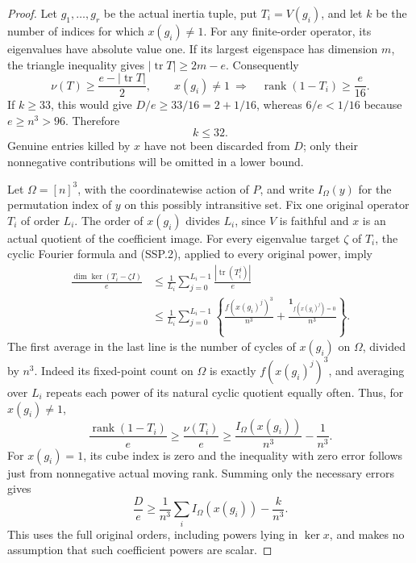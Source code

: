 \begin{proof}
Let $g_1,\ldots,g_r$ be the actual inertia tuple, put $T_i=V(g_i)$,
and let $k$ be the number of indices for which $x(g_i)\ne1$.
For any finite-order operator, its eigenvalues have absolute value
one.  If its largest eigenspace has dimension $m$, the triangle
inequality gives $|\operatorname{tr}T|\ge2m-e$.  Consequently
\[
 \nu(T)\ge\frac{e-|\operatorname{tr}T|}{2},\qquad
 x(g_i)\ne1\ \Longrightarrow\quad
 \operatorname{rank}(1-T_i)\ge\frac e{16}.
 \tag{SSP.3}
\]
If $k\ge33$, this would give
$D/e\ge33/16=2+1/16$, whereas $6/e<1/16$ because
$e\ge n^3>96$.  Therefore
\[
                              k\le32.
 \tag{SSP.4}
\]
Genuine entries killed by $x$ have not been discarded from $D$;
only their nonnegative contributions will be omitted in a lower
bound.

Let $\Omega=[n]^3$, with the coordinatewise action of $P$, and
write $I_\Omega(y)$ for the permutation index of $y$ on this
possibly intransitive set.  Fix one original operator $T_i$ of
order $L_i$.  The order of $x(g_i)$ divides $L_i$, since $V$ is
faithful and $x$ is an actual quotient of the coefficient image.
For every eigenvalue target $\zeta$ of $T_i$, the cyclic Fourier
formula and (SSP.2), applied to every original power, imply
\[
 \begin{split}
 \frac{\dim\ker(T_i-\zeta I)}e
 &\le\frac1{L_i}\sum_{j=0}^{L_i-1}
                \frac{|\operatorname{tr}(T_i^j)|}{e}\\
 &\le\frac1{L_i}\sum_{j=0}^{L_i-1}
       \left\{\frac{f(x(g_i)^j)^3}{n^3}
                    +\frac{\mathbf1_{f(x(g_i)^j)=0}}{n^3}\right\}.
 \end{split}
 \tag{SSP.5}
\]
The first average in the last line is the number of cycles of
$x(g_i)$ on $\Omega$, divided by $n^3$.  Indeed its fixed-point
count on $\Omega$ is exactly $f(x(g_i)^j)^3$, and averaging over
$L_i$ repeats each power of its natural cyclic quotient equally
often.  Thus, for $x(g_i)\ne1$,
\[
 \frac{\operatorname{rank}(1-T_i)}e
 \ge\frac{\nu(T_i)}e
 \ge\frac{I_\Omega(x(g_i))}{n^3}-\frac1{n^3}.
 \tag{SSP.6}
\]
For $x(g_i)=1$, its cube index is zero and the inequality with
zero error follows just from nonnegative actual moving rank.
Summing only the necessary errors gives
\[
 \frac De\ge\frac1{n^3}\sum_i I_\Omega(x(g_i))
                         -\frac{k}{n^3}.
 \tag{SSP.7}
\]
This uses the full original orders, including powers lying in
$\ker x$, and makes no assumption that such coefficient powers
are scalar.


\end{proof}
